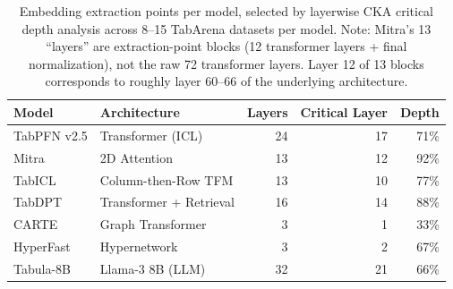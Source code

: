 \begin{table}[h]
\centering
\begin{tabular}{llrrr}
\toprule
\textbf{Model} & \textbf{Architecture} & \textbf{Layers} & \textbf{Critical Layer} & \textbf{Depth} \\
\midrule
TabPFN v2.5     & Transformer (ICL)        & 24 & 17 & 71\% \\
Mitra           & 2D Attention             & 13 & 12 & 92\% \\
TabICL          & Column-then-Row TFM      & 13 & 10 & 77\% \\
TabDPT          & Transformer + Retrieval  & 16 & 14 & 88\% \\
CARTE           & Graph Transformer        &  3 &  1 & 33\% \\
HyperFast       & Hypernetwork             &  3 &  2 & 67\% \\
Tabula-8B       & Llama-3 8B (LLM)         & 32 & 21 & 66\% \\
\bottomrule
\end{tabular}
\caption{Embedding extraction points per model, selected by layerwise CKA critical depth analysis across 8--15 TabArena datasets per model. Note: Mitra's 13 ``layers'' are extraction-point blocks (12 transformer layers + final normalization), not the raw 72 transformer layers. Layer 12 of 13 blocks corresponds to roughly layer 60--66 of the underlying architecture.}
\label{tab:extraction_layers}
\end{table}
